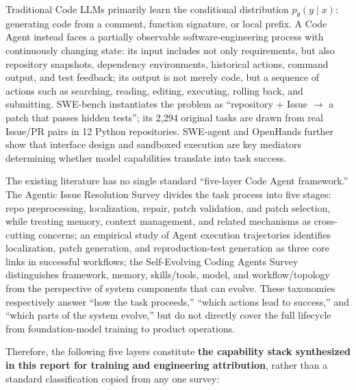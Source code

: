 \documentclass[10pt,a4paper,UTF8,fontset=none]{ctexart}
\begin{document}
Traditional Code LLMs primarily learn the conditional distribution $p_\theta(y\mid x)$: generating code from a comment, function signature, or local prefix. A Code Agent instead faces a partially observable software-engineering process with continuously changing state: its input includes not only requirements, but also repository snapshots, dependency environments, historical actions, command output, and test feedback; its output is not merely code, but a sequence of actions such as searching, reading, editing, executing, rolling back, and submitting. SWE-bench instantiates the problem as ``repository + Issue $\rightarrow$ a patch that passes hidden tests''; its 2,294 original tasks are drawn from real Issue/PR pairs in 12 Python repositories\cite{jimenez2024swebench}. SWE-agent and OpenHands further show that interface design and sandboxed execution are key mediators determining whether model capabilities translate into task success\cite{yang2024sweagent,wang2024openhands}.

The existing literature has no single standard ``five-layer Code Agent framework.'' The Agentic Issue Resolution Survey divides the task process into five stages: repo preprocessing, localization, repair, patch validation, and patch selection, while treating memory, context management, and related mechanisms as cross-cutting concerns\cite{jiang2025agentsurvey}; an empirical study of Agent execution trajectories identifies localization, patch generation, and reproduction-test generation as three core links in successful workflows\cite{ceka2025traceability}; the Self-Evolving Coding Agents Survey distinguishes framework, memory, skills/tools, model, and workflow/topology from the perspective of system components that can evolve\cite{zhou2026selfevolving}. These taxonomies respectively answer ``how the task proceeds,'' ``which actions lead to success,'' and ``which parts of the system evolve,'' but do not directly cover the full lifecycle from foundation-model training to product operations.

Therefore, the following five layers constitute \textbf{the capability stack synthesized in this report for training and engineering attribution}, rather than a standard classification copied from any one survey:
\end{document}
